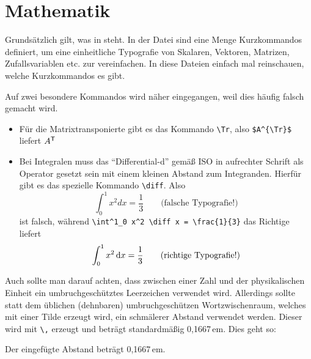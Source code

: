 \section{Mathematik}%
\label{sec:Mathe}
%
Grundsätzlich gilt, was in \parencites{ams1999a}{ams1999b} steht. In der Datei
 sind eine Menge Kurzkommandos definiert, um eine
einheitliche Typografie von Skalaren, Vektoren,
Matrizen, Zufallsvariablen etc.
zur vereinfachen. In diese Dateien einfach mal reinschauen, welche Kurzkommandos
es gibt.

Auf zwei besondere Kommandos wird näher eingegangen, weil dies häufig falsch
gemacht wird.
\begin{itemize}
  \item Für die Matrixtransponierte gibt es das Kommando \verb#\Tr#, also
	\verb#$A^{\Tr}$# liefert $A^{\mathsf{T}}$
	
	\item Bei Integralen muss das \enquote{Differential-d} gemäß
	ISO in aufrechter Schrift als Operator gesetzt sein mit einem kleinen Abstand
	zum Integranden. Hierfür gibt es das spezielle Kommando \verb#\diff#. Also
	\begin{equation}
	 \int^1_0 x^2 d x = \frac{1}{3} \qquad \text{(falsche Typografie!)}
	\end{equation}
	ist falsch, während \verb#\int^1_0 x^2 \diff x = \frac{1}{3}# das Richtige
	liefert
	\begin{equation}
	 \int^1_0 x^2 \mathop{}\!\mathrm{d} x = \frac{1}{3} \qquad \text{(richtige Typografie!)}
	\end{equation}
\end{itemize}

Auch sollte man darauf achten, dass zwischen einer Zahl und der physikalischen Einheit ein umbruchgeschütztes Leerzeichen verwendet wird.
Allerdings sollte statt dem üblichen (dehnbaren) umbruchgeschützen Wortzwischenraum, 
welches mit einer Tilde erzeugt wird, ein schmälerer Abstand verwendet werden.
Dieser wird mit \verb+\,+  erzeugt und beträgt standardmäßig 0,1667\,em. Dies geht so:
\begin{latex}
Der eingefügte Abstand beträgt 0,1667\,em.
\end{latex}
